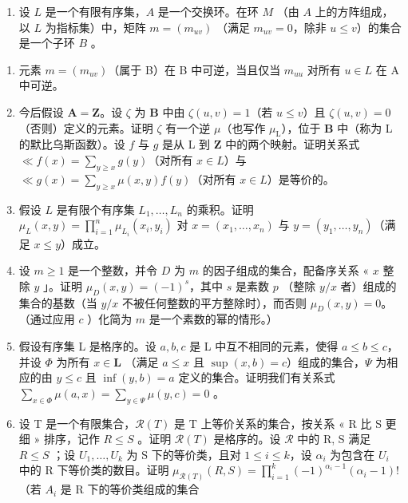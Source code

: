 \begin{enumerate}
\def\labelenumi{\arabic{enumi})}
\setcounter{enumi}{13}
\tightlist
\item
  设 \(L\) 是一个有限有序集，\(A\) 是一个交换环。在环 \(M\) （由 \(A\) 上的方阵组成，以 \(L\) 为指标集）中，矩阵 \(m = (m_{uv})\) （满足 \(m_{uv} = 0\)，除非 \(u \leqslant v\)）的集合是一个子环 \(B\) 。
\end{enumerate}

\begin{enumerate}
\def\labelenumi{\alph{enumi})}
\item
  元素 \(m = (m_{uv})\)（属于 B）在 B 中可逆，当且仅当 \(m_{uu}\) 对所有 \(u \in L\) 在 A 中可逆。
\item
  今后假设 \(\mathbf{A} = \mathbf{Z}\)。设 \(\zeta\) 为 \(\mathbf{B}\) 中由 \(\zeta(u, v) = 1\)（若 \(u \leqslant v\)）且 \(\zeta(u, v) = 0\)（否则）定义的元素。证明 \(\zeta\) 有一个逆 \(\mu\)（也写作 \(\mu_{\mathrm{L}}\)），位于 \(\mathbf{B}\) 中（称为 L 的默比乌斯函数）。设 \(f\) 与 \(g\) 是从 L 到 \(\mathbf{Z}\) 中的两个映射。证明关系式 \(\ll f(x) = \sum_{y \geqslant x} g(y)\)（对所有 \(x \in L\)）与 \(\ll g(x) = \sum_{y \geqslant x} \mu(x, y) f(y)\)（对所有 \(x \in L\)）是等价的。
\item
  假设 \(L\) 是有限个有序集 \(L_1, \ldots, L_n\) 的乘积。证明 \(\mu_L(x, y) = \prod_{i=1}^{n} \mu_{L_i}(x_i, y_i)\) 对 \(x = (x_1, \ldots, x_n)\) 与 \(y = (y_1, \ldots, y_n)\)（满足 \(x \leqslant y\)）成立。
\item
  设 \(m \geqslant 1\) 是一个整数，并令 \(D\) 为 \(m\) 的因子组成的集合，配备序关系 « \(x\) 整除 \(y\) 」。证明 \(\mu_{D}(x, y) = (-1)^{s}\)，其中 \(s\) 是素数 \(p\) （整除 \(y/x\) 者）组成的集合的基数（当 \(y/x\) 不被任何整数的平方整除时），而否则 \(\mu_{D}(x, y) = 0\)。（通过应用 \(c\) ）化简为 \(m\) 是一个素数的幂的情形。）
\item
  假设有序集 L 是格序的。设 \(a, b, c\) 是 L 中互不相同的元素，使得 \(a \leqslant b \leqslant c\)，并设 \(\Phi\) 为所有 \(x \in \mathbf{L}\) （满足 \(a \leqslant x\) 且 \(\sup(x, b) = c\)）组成的集合，\(\Psi\) 为相应的由 \(y \leqslant c\) 且 \(\inf(y, b) = a\) 定义的集合。证明我们有关系式 \(\sum_{x \in \Phi} \mu(a, x) = \sum_{y \in \Psi} \mu(y, c) = 0\) 。
\item
  设 T 是一个有限集合，\(\mathcal{R}(T)\) 是 T 上等价关系的集合，按关系 « R 比 S 更细 » 排序，记作 \(R \leqslant S\) 。证明 \(\mathcal{R}(T)\) 是格序的。设 \(\mathcal{R}\) 中的 R, S 满足 \(R \leqslant S\) ；设 \(U_1, \ldots, U_k\) 为 S 下的等价类，且对 \(1 \leqslant i \leqslant k\)，设 \(\alpha_i\) 为包含在 \(U_i\) 中的 R 下等价类的数目。证明 \(\mu_{\mathcal{R}(T)}(R, S) = \prod_{i=1}^{k} (-1)^{\alpha_i - 1} (\alpha_i - 1)!\)（若 \(A_i\) 是 R 下的等价类组成的集合
\end{enumerate}

